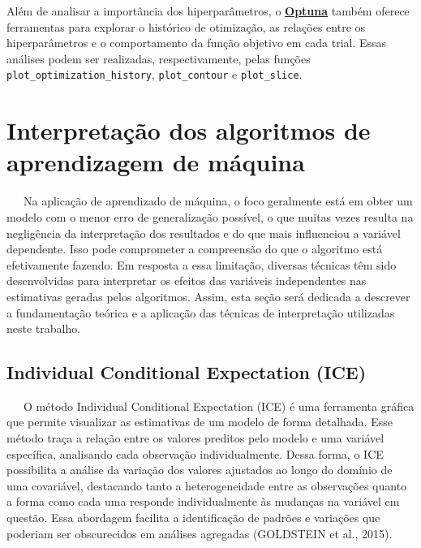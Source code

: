 \documentclass[
  12pt,
  a4paper,
]{scrreprt}
\begin{document}
\vspace{12pt}

Além de analisar a importância dos hiperparâmetros, o
\href{https://optuna.org/}{\textbf{Optuna}} também oferece ferramentas
para explorar o histórico de otimização, as relações entre os
hiperparâmetros e o comportamento da função objetivo em cada trial.
Essas análises podem ser realizadas, respectivamente, pelas funções
\texttt{plot\_optimization\_history}, \texttt{plot\_contour} e
\texttt{plot\_slice}.

\section{Interpretação dos algoritmos de aprendizagem de
máquina}\label{interpretauxe7uxe3o-dos-algoritmos-de-aprendizagem-de-muxe1quina}

~~~Na aplicação de aprendizado de máquina, o foco geralmente está em
obter um modelo com o menor erro de generalização possível, o que muitas
vezes resulta na negligência da interpretação dos resultados e do que
mais influenciou a variável dependente. Isso pode comprometer a
compreensão do que o algoritmo está efetivamente fazendo. Em resposta a
essa limitação, diversas técnicas têm sido desenvolvidas para
interpretar os efeitos das variáveis independentes nas estimativas
geradas pelos algoritmos. Assim, esta seção será dedicada a descrever a
fundamentação teórica e a aplicação das técnicas de interpretação
utilizadas neste trabalho.

\subsection{Individual Conditional Expectation
(ICE)}\label{individual-conditional-expectation-ice}

~~~O método Individual Conditional Expectation (ICE) é uma ferramenta
gráfica que permite visualizar as estimativas de um modelo de forma
detalhada. Esse método traça a relação entre os valores preditos pelo
modelo e uma variável específica, analisando cada observação
individualmente. Dessa forma, o ICE possibilita a análise da variação
dos valores ajustados ao longo do domínio de uma covariável, destacando
tanto a heterogeneidade entre as observações quanto a forma como cada
uma responde individualmente às mudanças na variável em questão. Essa
abordagem facilita a identificação de padrões e variações que poderiam
ser obscurecidos em análises agregadas (GOLDSTEIN et al., 2015).

\vspace{12pt}
\end{document}
